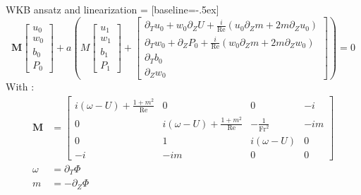 \documentclass[10pt]{beamer}
\begin{document}
\begin{frame}[fragile]{WKB ansatz and linearization}
   = [baseline=-.5ex]
  \begin{equation*}\!\!\!\!\!\!\!\!\!\!
  	\mathbf{M}
  	\begin{bmatrix}
  		u_{0}\\
  		w_{0}\\
  		b_{0}\\
  		P_{0}
  	\end{bmatrix}+a\left(M
  	\begin{bmatrix}
  		u_{1}\\
  		w_{1}\\
  		b_{1}\\
  		P_{1}
  	\end{bmatrix}+
  	\begin{bmatrix}
  		\partial_{T}u_{0}+w_{0}\partial_{Z}U+\frac{i}{\mathrm{Re}}\left(u_{0}\partial_{Z}m+2m\partial_{Z}u_{0} \right)\\
  		\partial_{T}w_{0}+\partial_{Z}P_{0}+\frac{i}{\mathrm{Re}}\left(w_{0}\partial_{Z}m+2m\partial_{Z}w_{0} \right)\\
  		\partial_{T}b_{0}\\
  		\partial_{Z}w_{0}
  	\end{bmatrix}
  	 \right) =0
  \end{equation*}
  With : 
  \begin{align*}
  	\mathbf{M} &=
  	\begin{bmatrix}
  		i\left(\omega-U\right)+\frac{1+m^{2}}{\mathrm{Re}} 	&  0  &  0 & -i  \\
  		0	& i\left(\omega-U\right)+\frac{1+m^{2}}{\mathrm{Re}}  & -\frac{1}{\mathrm{Fr}^{2}} & -im\\
  		0   &  1  &  i\left(\omega-U\right) & 0\\
  		-i  &  -im  &  0  &  0
  	\end{bmatrix}\\
  	\omega & = \partial_{T}\Phi \\
  	m &= -\partial_{Z}\Phi
  \end{align*}
\end{frame}
\end{document}
